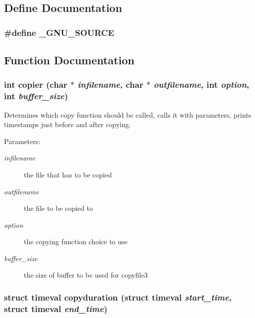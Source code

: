 \subsection{Define Documentation}
\subsubsection{\setlength{\rightskip}{0pt plus 5cm}\#define \_\-GNU\_\-SOURCE}\label{cptest1_8c_53abf256730d533302d1910e5fb61efe}




\subsection{Function Documentation}
\subsubsection{\setlength{\rightskip}{0pt plus 5cm}int copier (char $\ast$ {\em infilename}, char $\ast$ {\em outfilename}, int {\em option}, int {\em buffer\_\-size})}\label{cptest1_8c_8f6e8abca160301ac05384cd50fd1651}


Determines which copy function should be called, calls it with parameters, prints timestamps just before and after copying. \begin{Desc}
\item[Parameters:]
\begin{description}
\item[{\em infilename}]the file that has to be copied \item[{\em outfilename}]the file to be copied to \item[{\em option}]the copying function choice to use \item[{\em buffer\_\-size}]the size of buffer to be used for copyfile3 \end{description}
\end{Desc}
\subsubsection{\setlength{\rightskip}{0pt plus 5cm}struct timeval copyduration (struct timeval {\em start\_\-time}, struct timeval {\em end\_\-time})}\label{cptest1_8c_6983c07625f59199b36b6933782a4cf7}


